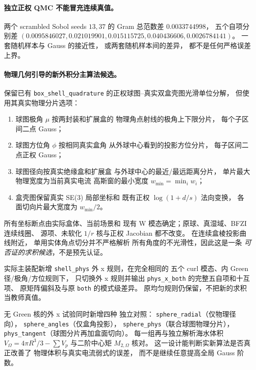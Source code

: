 \paragraph{独立正权 QMC 不能冒充连续真值。}
两个 scrambled Sobol seeds $13,37$
的 Gram 总范数差 $0.0033744998$，
五个自项分别差
$(0.0095846027,0.021019901,
0.015115725,0.040436606,0.0026784141)$。
一套随机样本与 Gauss 的接近性，
或两套随机样本间的差异，
都不是任何严格误差上界。

\paragraph{物理几何引导的新外积分主算法候选。}
保留已有 \texttt{box\_shell\_quadrature}
的正权球图--真实双盒壳图光滑单位分解，
但使用其真实物理分片选项：
\begin{enumerate}
\item 球图极角 $\mu$ 按两封装和扩展盒的
      物理角点射线的极角上下限分片，
      每个子区间二点 Gauss；
\item 球图方位角 $\phi$ 按相同真实盒角
      从外球中心看到的投影方位分片，
      每子区间二点正权 Gauss；
\item 球图径向按真实绝缘盒和扩展盒
      与外球中心的最近/最远距离分片，
      单片最大物理宽度为当前真实电流
      高斯窗的最小宽度
      $w_{\min}=\min_iw_i$；
\item 盒壳图保留真实 SE(3) 局部坐标和
      既有正权 $\log(1+d/s)$ 法向变换，
      各面切向片最大宽度为 $w_{\min}/2$。
\end{enumerate}
所有坐标断点由实际盒体、当前场景和
现有 W 模态确定；原球、真湿域、BFZI 连续线圈、
源项、未软化 $1/r$ 核与正权 Jacobian 都不改变。
在连续盒棱投影曲线附近，
单用实体角点切分并不严格解析
所有角度的不光滑性，因此这是一条
\emph{可否证的求积候选}，不是预先认证。

实际主装配新增 \texttt{shell\_phys}
外 x 规则，在完全相同的
五个 curl 模态、内 Green 径/极角/方位规则下，
只切换外 x 规则并输出
\texttt{phys\_x\_both} 的完整五自项和十互项、
原矩阵偏斜及与原 \texttt{both} 的模式级差异。
原均匀规则仍保留，不把新的求积当教师真值。

无 Green 核的外 x 试验同时新增四种
独立对照：
\texttt{sphere\_radial}（仅物理径向），
\texttt{sphere\_angles}（仅盒角投影），
\texttt{sphere\_phys}（联合球图物理分片），
\texttt{phys\_tangent}（球图分片再加盒面切向）。
每一组再与独立解析海水体积
$V_\Omega=4\pi R^3/3-\sum V_p$
与二阶中心矩 $M_{2,\Omega}$ 核对。
这一设计能判断实新算法是否真正改善了
物理体积与真实电流弱式的误差，
而不是继续任意提高全局 Gauss 阶数。

